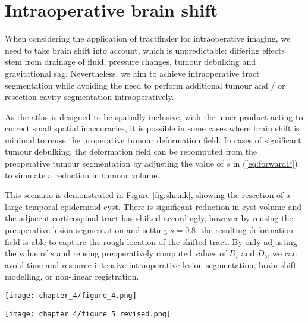 \section{Intraoperative brain shift}
\label{sec:imri}

When considering the application of tractfinder for intraoperative imaging, we need to take brain shift into account, which is unpredictable: differing effects stem from drainage of fluid, pressure changes, tumour debulking and gravitational sag.
Nevertheless, we aim to achieve intraoperative tract segmentation while avoiding the need to perform additional tumour and / or resection cavity segmentation intraoperatively.

As the atlas is designed to be spatially inclusive, with the inner product acting to correct small spatial inaccuracies, it is possible in some cases where brain shift is minimal to reuse the properative tumour deformation field.
In cases of significant tumour debulking, the deformation field can be recomputed from the preoperative tumour segmentation by adjusting the value of $s$ in (\ref{eq:forwardP}) to simulate a reduction in tumour volume.

This scenario is demonstrated in Figure \ref{fig:shrink}, showing the resection of a large temporal epidermoid cyst.
There is significant reduction in cyst volume and the adjacent corticospinal tract has shifted accordingly, however by reusing the preoperative lesion segmentation and setting $s=0.8$, the resulting deformation field is able to capture the rough location of the shifted tract.
By only adjusting the value of $s$ and reusing preoperatively computed values of $D_t$ and $D_b$, we can avoid time and resource-intensive intraoperative lesion segmentation, brain shift modelling, or non-linear registration.

\begin{figure*}[h!]
  \centering
  \texttt{[image: chapter\_4/figure\_4.png]}
  \caption{Example results in intraoperative image using scaled preoperative tumour segmentation. Blue outline: Tumour segmentation. Green outline: effective tumour boundary with $s=0.8$ used for intraoperative segmentation}
  \label{fig:shrink}
\end{figure*}

\begin{figure*}[h!]
  \centering
  \texttt{[image: chapter\_4/figure\_5\_revised.png]}
  \caption{Sample results in 4 different clinical subjects. First column: linearly registered tract atlas (spatial component only). Second column: atlas after tumour deformation. Third column: Final tract map. Fourth column: Track density image from streamline tractography, where intensity corresponds to streamline count per $(2.5mm)^3$ voxel (thresholded at 10 streamlines).}
  \label{fig:res}
\end{figure*}

